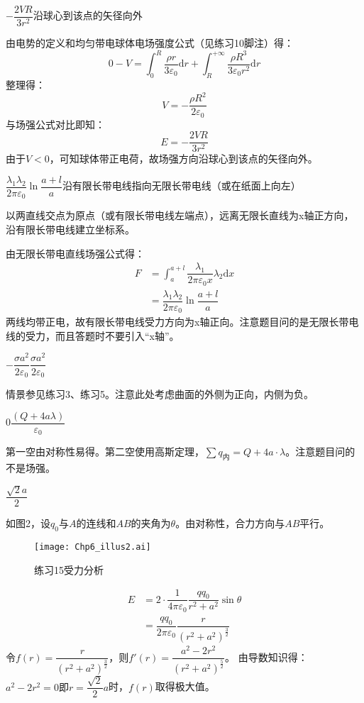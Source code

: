 \documentclass[b5paper,opensource]{./template/qyxf-book}
\newcommand{\di}[1]{\mathrm{d}#1}
\begin{document}
$-\dfrac{2VR}{3r^2}$\quad 沿球心到该点的矢径向外

\solve
由电势的定义和均匀带电球体电场强度公式（见练习10脚注）得：
\[
0-V=\int_{0}^{R}\dfrac{\rho r}{3\varepsilon_0}\di{r}+\int_{R}^{+\infty}\dfrac{\rho R^3}{3\varepsilon_0 r^2}\di{r}
\]
整理得：
\[
V=-\dfrac{\rho R^2}{2\varepsilon_0}
\]
与场强公式对比即知：
\[
E=-\dfrac{2VR}{3r^2}
\]
由于$V<0$，可知球体带正电荷，故场强方向沿球心到该点的矢径向外。

$\dfrac{\lambda_1\lambda_2}{2\pi \varepsilon_0}\ln\dfrac{a+l}{a}$\quad 沿有限长带电线指向无限长带电线（或在纸面上向左）

\solve
以两直线交点为原点（或有限长带电线左端点），远离无限长直线为x轴正方向，沿有限长带电线建立坐标系。

由无限长带电直线场强公式得：
\begin{align*}
	F&=\int_{a}^{a+l}\dfrac{\lambda_1}{2\pi \varepsilon_0 x}\lambda_2\di{x}\\
	&=\dfrac{\lambda_1\lambda_2}{2\pi \varepsilon_0}\ln\dfrac{a+l}{a}
\end{align*}
两线均带正电，故有限长带电线受力方向为x轴正向。注意题目问的是无限长带电线的受力，而且答题时不要引入“x轴”。

$-\dfrac{\sigma a^2}{2\varepsilon_0}$\quad$\dfrac{\sigma a^2}{2\varepsilon_0}$

\solve
情景参见练习3、练习5。注意此处考虑曲面的外侧为正向，内侧为负。

0\quad $\dfrac{(Q+4a\lambda)}{\varepsilon_0}$

\solve
第一空由对称性易得。第二空使用高斯定理，$\sum q_{\text{内}}=Q+4a\cdot\lambda$。注意题目问的不是场强。

$\dfrac{\sqrt{2}a}{2}$

\solve
如图2，设$q_0$与$A$的连线和$AB$的夹角为$\theta$。由对称性，合力方向与$AB$平行。
\begin{figure}[!h]
	\centering
	\texttt{[image: Chp6\_illus2.ai]}
	\caption{练习15\quad 受力分析}
\end{figure}
\begin{align*}
	E&=2\cdot \dfrac{1}{4\pi\varepsilon_0}\dfrac{qq_0}{r^2+a^2}\sin\theta\\
	&=\dfrac{qq_0}{2\pi\varepsilon_0}\dfrac{r}{{(r^2+a^2)}^{\frac{3}{2}}}
\end{align*}
令$f(r)=\dfrac{r}{{(r^2+a^2)}^{\frac{3}{2}}}$，则$f'(r)=\dfrac{a^2-2r^2}{{(r^2+a^2)}^{\frac{5}{2}}}$。
由导数知识得：$a^2-2r^2=0\text{即}r=\dfrac{\sqrt{2}}{2}a$时，$f(r)$取得极大值。
\end{document}
